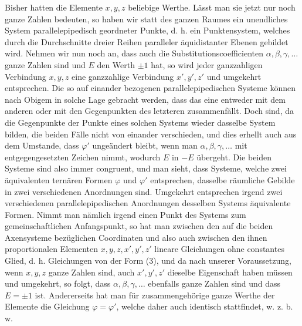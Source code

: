 \documentclass[11pt]{article}
\begin{document}
Bisher hatten die Elemente $x,y,z$ beliebige Werthe. Lässt man sie jetzt nur noch ganze Zahlen bedeuten, so haben wir statt des ganzen Raumes ein unendliches System parallelepipedisch geordneter Punkte, d. h. ein Punktensystem, welches durch die Durchschnitte dreier Reihen paralleler äquidistanter Ebenen gebildet wird. Nehmen wir nun noch an, dass auch die Substitutionscoefficienten $\alpha,\beta,\gamma,\ldots$ ganze Zahlen sind und $E$ den Werth $\pm1$ hat, so wird jeder ganzzahligen Verbindung $x,y,z$ eine ganzzahlige Verbindung $x',y',z'$ und umgekehrt entsprechen. Die so auf einander bezogenen parallelepipedischen Systeme können nach Obigem in solche Lage gebracht werden, dass das eine entweder mit dem anderen oder mit den Gegenpunkten des letzteren zusammenfällt. Doch sind, da die Gegenpunkte der Punkte eines solchen Systems wieder dasselbe System bilden, die beiden Fälle nicht von einander verschieden, und dies erhellt auch aus dem Umstande, dass $\varphi'$ ungeändert bleibt, wenn man $\alpha,\beta,\gamma,\ldots$ mit entgegengesetzten Zeichen nimmt, wodurch $E$ in $-E$ übergeht. Die beiden Systeme sind also immer congruent, und man sieht, dass Systeme, welche zwei äquivalenten ternären Formen $\varphi$ und $\varphi'$ entsprechen, dasselbe räumliche Gebilde in zwei verschiedenen Anordnungen sind. Umgekehrt entsprechen irgend zwei verschiedenen parallelepipedischen Anordnungen desselben Systems äquivalente Formen. Nimmt man nämlich irgend einen Punkt des Systems zum gemeinschaftlichen Anfangspunkt, so hat man zwischen den auf die beiden Axensysteme bezüglichen Coordinaten und also auch zwischen den ihnen proportionalen Elementen $x,y,z,x',y',z'$ lineare Gleichungen ohne constantes Glied, d. h. Gleichungen von der Form (3), und da nach unserer Voraussetzung, wenn $x,y,z$ ganze Zahlen sind, auch $x',y',z'$ dieselbe Eigenschaft haben müssen und umgekehrt, so folgt, dass $\alpha,\beta,\gamma,\ldots$ ebenfalls ganze Zahlen sind und dass $E=\pm1$ ist. Andererseits hat man für zusammengehörige ganze Werthe der Elemente die Gleichung $\varphi=\varphi'$, welche daher auch identisch stattfindet, w. z. b. w.
\end{document}
